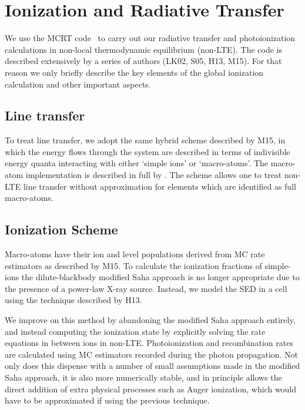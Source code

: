 \documentclass[useAMS,usenatbib]{mn2e_x}
\begin{document}

\section{Ionization and Radiative Transfer}

We use the MCRT code \py\ to carry out our radiative transfer and photoionization
calculations in non-local thermodynamic equilibrium (non-LTE). 
The code is described extensively by a series of authors (LK02, S05, H13, M15).
For that reason we only briefly describe the key elements of the global 
ionization calculation and other important aspects.

\subsection{Line transfer}

To treat line transfer, we adopt the same hybrid scheme 
described by M15, 
in which the energy flows
through the system are described in terms of indivisible
energy quanta interacting with either `simple ions'
or `macro-atoms'. The macro-atom implementation 
is described in full by \cite{lucy2002, lucy2003}.
The scheme allows one to treat non-LTE line transfer without
approximation for elements which are identified as 
full macro-atoms.


\subsection{Ionization Scheme}

Macro-atoms have their ion and level populations derived from
MC rate estimators as described by M15. To calculate the ionization fractions
of simple-ions the dilute-blackbody modified Saha approach \citep{ML93} is no longer appropriate
due to the presence of a power-law X-ray source. Instead, we model
the SED in a cell using the technique described by H13.

We improve on this method by abandoning the modified Saha approach
entirely, and instead computing the ionization state by 
explicitly solving the rate equations in between ions in non-LTE. 
Photoionization and recombination rates are calculated using MC estimators recorded
during the photon propagation. Not only does this dispense with a number of
small assumptions made in the modified Saha approach, it is also more numerically stable, 
and in principle allows the direct addition of extra physical processes such as Auger ionization, which would have to be approximated if using the previous technique.
\end{document}
